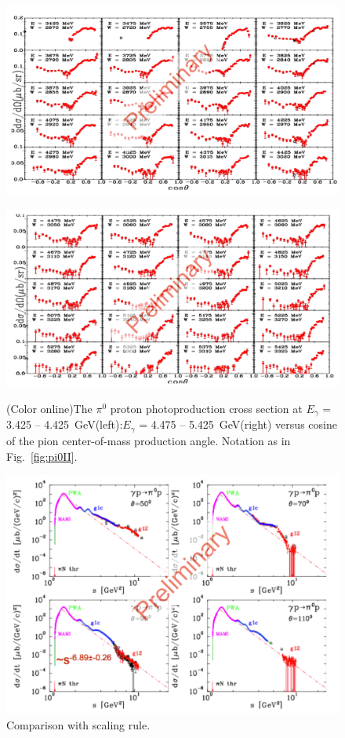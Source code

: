 \begin{figure}[h!]
	\centering
	\begin{minipage}{.50\textwidth}
		\centering
		\includegraphics[width=225 pt, height = 160 pt]{figures/pi0_xsectionIII.pdf}
		\caption{}{}
		\label{fig:pi0III}
	\end{minipage}%
	\centering
	\begin{minipage}{.50\textwidth}
		\centering
		\includegraphics[width=225 pt, height = 155 pt]{figures/pi0_xsectionIV.pdf}
		\caption{(Color online)The $\pi^0$ proton photoproduction cross section at $E_{\gamma}$ = 3.425 -- 4.425~GeV(left):$E_{\gamma}$ = 4.475 -- 5.425~GeV(right) versus cosine of the pion center-of-mass production angle. Notation as in Fig.~\protect\ref{fig:pi0II}.}{}
		\label{fig:pi0IV}
	\end{minipage}
\end{figure}

\begin{figure}[h]
	\centerline{\includegraphics[width=250 pt]{figures/pi0_scaling.pdf}}
	\caption{Comparison with scaling rule. }
	\label{fig:pi0_scaling}
\end{figure}